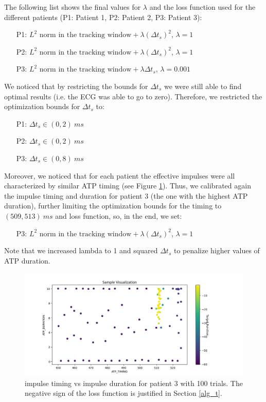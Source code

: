 \documentclass[11pt,a4paper]{article}
\begin{document}
The following list shows the final values for $\lambda$ and the loss function used for the different patients (P1: Patient 1, P2: Patient 2, P3: Patient 3):
\begin{itemize}
    \item [P1:] $L^2 \textrm{ norm in the tracking window} + \lambda (\Delta t_s)^2$, $\lambda = 1$ 
    \item [P2:] $L^2 \textrm{ norm in the tracking window} + \lambda (\Delta t_s)^2$, $\lambda = 1$ 
    \item [P3:] $L^2 \textrm{ norm in the tracking window} + \lambda \Delta t_s$, $\lambda = 0.001$
\end{itemize}
\vspace{2mm}
We noticed that by restricting the bounds for $\Delta t_s$ we were still able to find optimal results (i.e. the ECG was able to go to zero). Therefore, we restricted the optimization bounds for $\Delta t_s$ to:
\begin{itemize}
    \item [P1:] $\Delta t_s  \in (0, 2) \ ms$ 
    \item [P2:] $\Delta t_s  \in (0, 2) \ ms$
    \item [P3:] $\Delta t_s  \in (0, 8) \ ms$ 
\end{itemize}
\vspace{1mm}
Moreover, we noticed that for each patient the effective impulses were all characterized by similar ATP timing (see Figure \ref{patient3attempts}). Thus, we calibrated again the impulse timing and duration for patient 3 (the one with the highest ATP duration), further limiting the optimization bounds for the timing to $(509, 513) \ ms$ and loss function, so, in the end, we set:
\vspace{1mm}
\begin{itemize}
    \item [P3:] $L^2 \textrm{ norm in the tracking window} + \lambda (\Delta t_s)^2$, $\lambda = 1$
\end{itemize}
\vspace{1mm}
Note that we increased lambda to 1 and squared $\Delta t_s$ to penalize higher values of ATP duration. 

\begin{figure}[H]
\begin{center}
\includegraphics[width = 14cm]{patient_3_attempts.png}
    \caption{impulse timing vs impulse duration for patient 3 with 100 trials. The negative sign of the loss function is justified in Section \ref{alg_t}.}
    \label{patient3attempts}
\end{center}
\end{figure}
\end{document}
